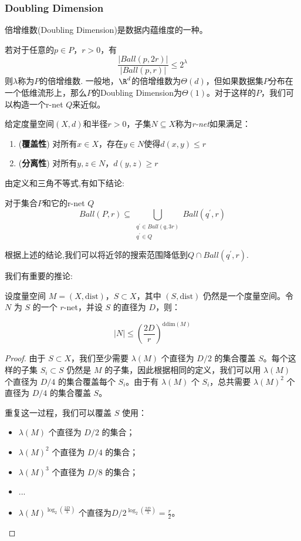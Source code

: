 \documentclass[lang=cn,newtx,10pt,scheme=chinese,chinesefont=nofont,citestyle=gb7714-2015, bibstyle=gb7714-2015]{elegantbook}
\begin{document}
\begin{refsection}
\subsubsection{Doubling Dimension}

倍增维数(Doubling Dimension)是数据内蕴维度的一种。

若对于任意的$p\in P$，$r>0$，有$$\frac{|Ball(p,2r)|}{|Ball(p,r)|}\leq 2^\lambda$$则$\lambda$称为$P$的倍增维数. 一般地，$\R^d$的倍增维数为$\Theta(d)$，但如果数据集$P$分布在一个低维流形上，那么$P$的Doubling Dimension为$\Theta(1)$。对于这样的$P$，我们可以构造一个r-net $Q$来近似。

\begin{definition}[r-net]
给定度量空间$(X,d)$和半径$r>0$，子集$N \subseteq X$称为\emph{r-net}如果满足：
\begin{enumerate}
\item (\textbf{覆盖性}) 对所有$x \in X$，存在$y \in N$使得$d(x,y) \leq r$
\item (\textbf{分离性}) 对所有$y,z \in N$，$d(y,z) \geq r$
\end{enumerate}
\end{definition}

 由定义和三角不等式,有如下结论: 
 \begin{lemma}
对于集合$P$和它的r-net $Q$\[Ball(P,r)\subseteq\bigcup\limits_{\substack{q^\prime\in Ball(q,3r)\\ q^\prime\in Q
     }}Ball(q^\prime,r)\]
 \end{lemma}

根据上述的结论,我们可以将近邻的搜索范围降低到$Q\cap Ball(q^\prime,r)$.

我们有重要的推论:


\begin{lemma}
    设度量空间 $M = (X, \text{dist})$，$S \subset X$，其中 $(S, \text{dist})$ 仍然是一个度量空间。令 $N$ 为 $S$ 的一个 $r$-net，并设 $S$ 的直径为 $D$，则：


\[
|N| \leq (\frac{2D}{r})^{\text{ddim}(M)}
\]

\end{lemma} 


\begin{proof}
    由于 $S \subset X$，我们至少需要 $\lambda(M)$ 个直径为 $D/2$ 的集合覆盖 $S$。每个这样的子集 $S_i \subset S$ 仍然是 $M$ 的子集，因此根据相同的定义，我们可以用 $\lambda(M)$ 个直径为 $D/4$ 的集合覆盖每个 $S_i$。由于有 $\lambda(M)$ 个 $S_i$，总共需要 $\lambda(M)^2$ 个直径为 $D/4$ 的集合覆盖 $S$。

重复这一过程，我们可以覆盖 $S$ 使用：
\begin{itemize}
    \item $\lambda(M)$ 个直径为 $D/2$ 的集合；
    \item $\lambda(M)^2$ 个直径为 $D/4$ 的集合；
    \item $\lambda(M)^3$ 个直径为 $D/8$ 的集合；
    \item ...
    \item $\lambda(M)^{\log_2(\frac{2D}{\lambda})}$ 个直径为$D/2^{\log_2(\frac{2D}{\lambda})} = \frac{r}{2}$。
\end{itemize}


\end{proof}
\end{refsection}
\end{document}
